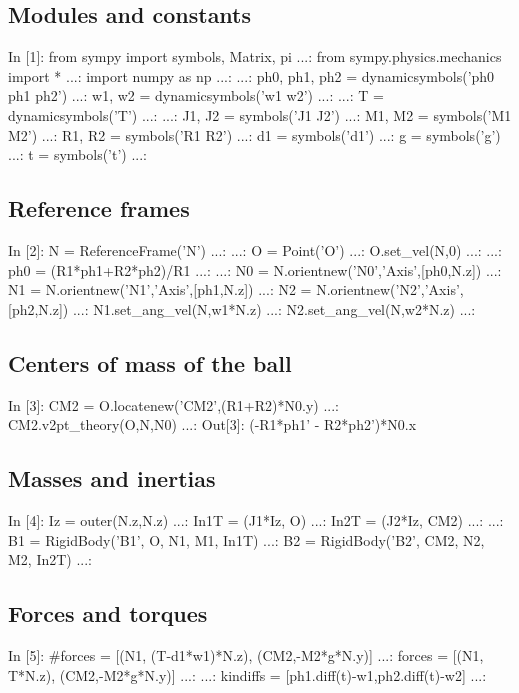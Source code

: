 \subsection{Modules and constants}
\begin{code}
In [1]: from sympy import symbols, Matrix, pi
   ...: from sympy.physics.mechanics import *
   ...: import numpy as np
   ...: 
   ...: ph0, ph1, ph2 = dynamicsymbols('ph0 ph1 ph2')
   ...: w1, w2 = dynamicsymbols('w1 w2')
   ...: 
   ...: T = dynamicsymbols('T')
   ...: 
   ...: J1, J2 = symbols('J1 J2')
   ...: M1, M2 = symbols('M1 M2')
   ...: R1, R2 = symbols('R1 R2')
   ...: d1     = symbols('d1')
   ...: g      = symbols('g')
   ...: t      = symbols('t')
   ...: 
\end{code}

\subsection{Reference frames}
\begin{code}
In [2]: N = ReferenceFrame('N')
   ...: 
   ...: O = Point('O')
   ...: O.set_vel(N,0)
   ...: 
   ...: ph0 = (R1*ph1+R2*ph2)/R1
   ...: 
   ...: N0 = N.orientnew('N0','Axis',[ph0,N.z])
   ...: N1 = N.orientnew('N1','Axis',[ph1,N.z])
   ...: N2 = N.orientnew('N2','Axis',[ph2,N.z])
   ...: N1.set_ang_vel(N,w1*N.z)
   ...: N2.set_ang_vel(N,w2*N.z)
   ...: 

\end{code}

\subsection{Centers of mass of the ball}
\begin{code}
In [3]: CM2 = O.locatenew('CM2',(R1+R2)*N0.y)
   ...: CM2.v2pt_theory(O,N,N0)
   ...: 
Out[3]: (-R1*ph1' - R2*ph2')*N0.x
\end{code}

\subsection{Masses and inertias}
\begin{code}
In [4]: Iz = outer(N.z,N.z)
   ...: In1T = (J1*Iz, O)
   ...: In2T = (J2*Iz, CM2)
   ...: 
   ...: B1 = RigidBody('B1', O, N1, M1, In1T)
   ...: B2 = RigidBody('B2', CM2, N2, M2, In2T)
   ...: 
\end{code}

\subsection{Forces and torques}
\begin{code}
In [5]: #forces = [(N1, (T-d1*w1)*N.z), (CM2,-M2*g*N.y)]
   ...: forces = [(N1, T*N.z), (CM2,-M2*g*N.y)]
   ...: 
   ...: kindiffs = [ph1.diff(t)-w1,ph2.diff(t)-w2]
   ...: 
\end{code}

